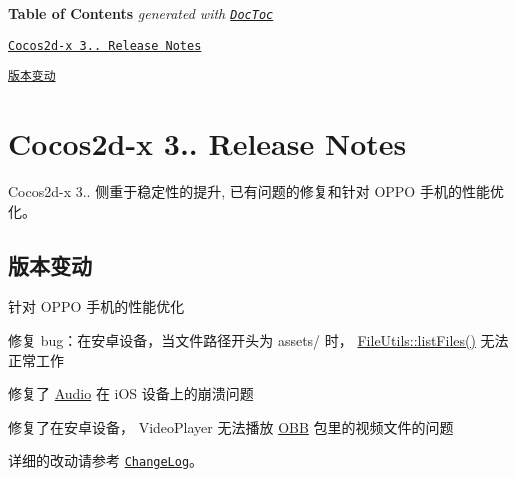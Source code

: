 {\bfseries Table of Contents} {\itshape generated with \href{https://github.com/thlorenz/doctoc}{\tt Doc\+Toc}}


\begin{DoxyItemize}
\item \href{#cocos2d-x-3172-release-notes}{\tt Cocos2d-\/x 3.. Release Notes}
\begin{DoxyItemize}
\item \href{#%E7%89%88%E6%9C%AC%E5%8F%98%E5%8A%A8}{\tt 版本变动}
\end{DoxyItemize}
\end{DoxyItemize}

\section*{Cocos2d-\/x 3.. Release Notes}

Cocos2d-\/x 3.. 侧重于稳定性的提升, 已有问题的修复和针对 O\+P\+PO 手机的性能优化。

\subsection*{版本变动}


\begin{DoxyItemize}
\item 针对 O\+P\+PO 手机的性能优化
\item 修复 bug：在安卓设备，当文件路径开头为 {\ttfamily assets/} 时， {\ttfamily \hyperlink{classFileUtils_a88fc43b561884e12a9a2d41a9e3b4df4}{File\+Utils\+::list\+Files()}} 无法正常工作
\item 修复了 \hyperlink{classAudio}{Audio} 在 i\+OS 设备上的崩溃问题
\item 修复了在安卓设备， {\ttfamily Video\+Player} 无法播放 \hyperlink{classOBB}{O\+BB} 包里的视频文件的问题
\end{DoxyItemize}

详细的改动请参考 \href{https://github.com/cocos2d/cocos2d-x/blob/v3/CHANGELOG}{\tt Change\+Log}。 
